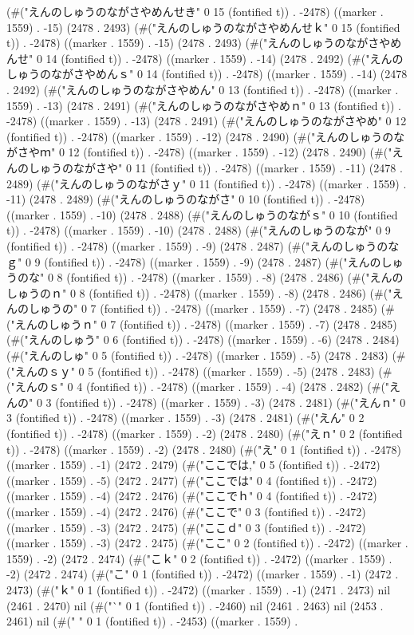 {(#("えんのしゅうのながさやめんせき" 0 15 (fontified t)) . -2478) ((marker . 1559) . -15) (2478 . 2493) (#("えんのしゅうのながさやめんせｋ" 0 15 (fontified t)) . -2478) ((marker . 1559) . -15) (2478 . 2493) (#("えんのしゅうのながさやめんせ" 0 14 (fontified t)) . -2478) ((marker . 1559) . -14) (2478 . 2492) (#("えんのしゅうのながさやめんｓ" 0 14 (fontified t)) . -2478) ((marker . 1559) . -14) (2478 . 2492) (#("えんのしゅうのながさやめん" 0 13 (fontified t)) . -2478) ((marker . 1559) . -13) (2478 . 2491) (#("えんのしゅうのながさやめｎ" 0 13 (fontified t)) . -2478) ((marker . 1559) . -13) (2478 . 2491) (#("えんのしゅうのながさやめ" 0 12 (fontified t)) . -2478) ((marker . 1559) . -12) (2478 . 2490) (#("えんのしゅうのながさやｍ" 0 12 (fontified t)) . -2478) ((marker . 1559) . -12) (2478 . 2490) (#("えんのしゅうのながさや" 0 11 (fontified t)) . -2478) ((marker . 1559) . -11) (2478 . 2489) (#("えんのしゅうのながさｙ" 0 11 (fontified t)) . -2478) ((marker . 1559) . -11) (2478 . 2489) (#("えんのしゅうのながさ" 0 10 (fontified t)) . -2478) ((marker . 1559) . -10) (2478 . 2488) (#("えんのしゅうのながｓ" 0 10 (fontified t)) . -2478) ((marker . 1559) . -10) (2478 . 2488) (#("えんのしゅうのなが" 0 9 (fontified t)) . -2478) ((marker . 1559) . -9) (2478 . 2487) (#("えんのしゅうのなｇ" 0 9 (fontified t)) . -2478) ((marker . 1559) . -9) (2478 . 2487) (#("えんのしゅうのな" 0 8 (fontified t)) . -2478) ((marker . 1559) . -8) (2478 . 2486) (#("えんのしゅうのｎ" 0 8 (fontified t)) . -2478) ((marker . 1559) . -8) (2478 . 2486) (#("えんのしゅうの" 0 7 (fontified t)) . -2478) ((marker . 1559) . -7) (2478 . 2485) (#("えんのしゅうｎ" 0 7 (fontified t)) . -2478) ((marker . 1559) . -7) (2478 . 2485) (#("えんのしゅう" 0 6 (fontified t)) . -2478) ((marker . 1559) . -6) (2478 . 2484) (#("えんのしゅ" 0 5 (fontified t)) . -2478) ((marker . 1559) . -5) (2478 . 2483) (#("えんのｓｙ" 0 5 (fontified t)) . -2478) ((marker . 1559) . -5) (2478 . 2483) (#("えんのｓ" 0 4 (fontified t)) . -2478) ((marker . 1559) . -4) (2478 . 2482) (#("えんの" 0 3 (fontified t)) . -2478) ((marker . 1559) . -3) (2478 . 2481) (#("えんｎ" 0 3 (fontified t)) . -2478) ((marker . 1559) . -3) (2478 . 2481) (#("えん" 0 2 (fontified t)) . -2478) ((marker . 1559) . -2) (2478 . 2480) (#("えｎ" 0 2 (fontified t)) . -2478) ((marker . 1559) . -2) (2478 . 2480) (#("え" 0 1 (fontified t)) . -2478) ((marker . 1559) . -1) (2472 . 2479) (#("ここでは," 0 5 (fontified t)) . -2472) ((marker . 1559) . -5) (2472 . 2477) (#("ここでは" 0 4 (fontified t)) . -2472) ((marker . 1559) . -4) (2472 . 2476) (#("ここでｈ" 0 4 (fontified t)) . -2472) ((marker . 1559) . -4) (2472 . 2476) (#("ここで" 0 3 (fontified t)) . -2472) ((marker . 1559) . -3) (2472 . 2475) (#("ここｄ" 0 3 (fontified t)) . -2472) ((marker . 1559) . -3) (2472 . 2475) (#("ここ" 0 2 (fontified t)) . -2472) ((marker . 1559) . -2) (2472 . 2474) (#("こｋ" 0 2 (fontified t)) . -2472) ((marker . 1559) . -2) (2472 . 2474) (#("こ" 0 1 (fontified t)) . -2472) ((marker . 1559) . -1) (2472 . 2473) (#("ｋ" 0 1 (fontified t)) . -2472) ((marker . 1559) . -1) (2471 . 2473) nil (2461 . 2470) nil (#("`" 0 1 (fontified t)) . -2460) nil (2461 . 2463) nil (2453 . 2461) nil (#(" " 0 1 (fontified t)) . -2453) ((marker . 1559) . }
